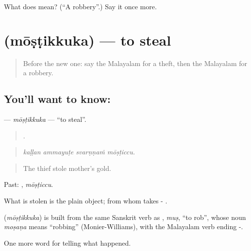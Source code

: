 \begin{tcolorbox}[breakable,colback=teal!4,colframe=teal!35!black,title={Before you move on}]
What does  mean? (\textquotedblleft{}A robbery\textquotedblright{}.) Say it once more.
\end{tcolorbox}
\section[\texorpdfstring{\ml{മോഷ്ടിക്കുക} (mōṣṭikkuka)}{മോഷ്ടിക്കുക (mōṣṭikkuka)}]{ (mōṣṭikkuka) — to steal}

\label{lesson:ML-C364-mostikkuka}



\begin{quote}
Before the new one: say the Malayalam for a theft, then the Malayalam for a robbery.
\end{quote}

\subsection*{You'll want to know: }
\textbf{} — \emph{mōṣṭikkuka} — \textquotedblleft{}to steal\textquotedblright{}.

\begin{quote}
   .
\end{quote}

\begin{quote}
\emph{kaḷḷan ammayuṭe svarṇṇaṁ mōṣṭiccu.}
\end{quote}

\begin{quote}
The thief stole mother's gold.
\end{quote}

Past: , \emph{mōṣṭiccu}.

What is stolen is the plain object; from whom takes - .

\begin{cousinweb}
\textbf{} (\emph{mōṣṭikkuka}) is built from the same Sanskrit verb as , \emph{muṣ}, \textquotedblleft{}to rob\textquotedblright{}, whose noun \emph{moṣaṇa} means \textquotedblleft{}robbing\textquotedblright{} (Monier-Williams), with the Malayalam verb ending -.
\end{cousinweb}

\begin{grammarlens}[title={What you've built}]
One more word for telling what happened.
\end{grammarlens}

